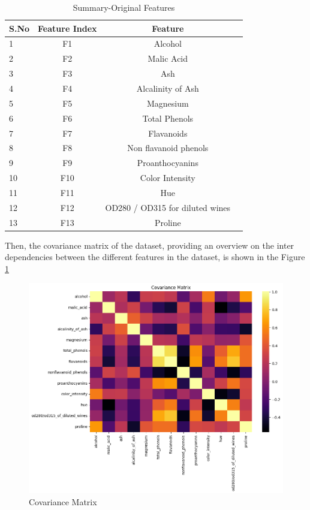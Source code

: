 \begin{table}[h]
	\centering
	\fontsize{10}{12}\selectfont
	\caption{Summary-Original Features}
	\label{summary of original features}
	\begin{tabular}{|p{3cm}|c|c|l|}
		\hline
		\textbf{S.No} & \textbf{Feature Index} & \textbf{Feature}\\
		\hline
		1 & F1 & Alcohol\\
		\hline
		2 & F2 & Malic Acid\\
		\hline
		3 & F3 & Ash\\
		\hline
		4 & F4 & Alcalinity of Ash\\
		\hline
		5 & F5 & Magnesium\\
		\hline
		6 & F6 & Total Phenols\\
		\hline
		7 & F7 & Flavanoids\\
		\hline
		8 & F8 & Non flavanoid phenols\\
		\hline
		9 & F9 & Proanthocyanins\\
		\hline
		10 & F10 & Color Intensity\\
		\hline
		11 & F11 & Hue\\
		\hline
		12 & F12 & OD280 / OD315 for diluted wines\\
		\hline
		13 & F13 & Proline\\
		\hline
	\end{tabular}
	
	\label{tab:summary of original features}
\end{table}

Then, the covariance matrix of the dataset, providing an overview on the inter dependencies between the different features in the dataset, is shown in the Figure \ref{the covariance matrix}
\begin{figure}[H]
	\centerline{\includegraphics[scale = 0.8125]{Figures/covariance_matrix.png}}
	\caption{Covariance Matrix}
	\label{the covariance matrix}
\end{figure}


